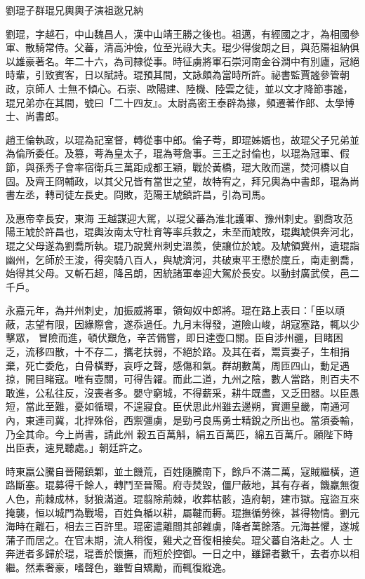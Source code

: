 
\begin{pinyinscope}

 劉琨子群琨兄輿輿子演祖逖兄納



 劉琨，字越石，中山魏昌人，漢中山靖王勝之後也。祖邁，有經國之才，為相國參軍、散騎常侍。父蕃，清高沖儉，位至光祿大夫。琨少得俊朗之目，與范陽祖納俱以雄豪著名。年二十六，為司隸從事。時征虜將軍石崇河南金谷澗中有別廬，冠絕時輩，引致賓客，日以賦詩。琨預其間，文詠頗為當時所許。祕書監賈謐參管朝政，京師人
 士無不傾心。石崇、歐陽建、陸機、陸雲之徒，並以文才降節事謐，琨兄弟亦在其間，號曰「二十四友』。太尉高密王泰辟為掾，頻遷著作郎、太學博士、尚書郎。



 趙王倫執政，以琨為記室督，轉從事中郎。倫子荂，即琨姊婿也，故琨父子兄弟並為倫所委任。及篡，荂為皇太子，琨為荂詹事。三王之討倫也，以琨為冠軍、假節，與孫秀子會率宿衛兵三萬距成都王穎，戰於黃橋，琨大敗而還，焚河橋以自固。及齊王冏輔政，以其父兄皆有當世之望，故特宥之，拜兄輿為中書郎，琨為尚書左丞，轉司徒左長史。冏敗，范陽王虓鎮許昌，引為司馬。



 及惠帝幸長安，東海
 王越謀迎大駕，以琨父蕃為淮北護軍、豫州刺史。劉喬攻范陽王虓於許昌也，琨輿汝南太守杜育等率兵救之，未至而虓敗，琨輿虓俱奔河北，琨之父母遂為劉喬所執。琨乃說冀州刺史溫羨，使讓位於虓。及虓領冀州，遺琨詣幽州，乞師於王浚，得突騎八百人，與虓濟河，共破東平王懋於廩丘，南走劉喬，始得其父母。又斬石超，降呂朗，因統諸軍奉迎大駕於長安。以動封廣武侯，邑二千戶。



 永嘉元年，為并州刺史，加振威將軍，領匈奴中郎將。琨在路上表曰：「臣以頑蔽，志望有限，因緣際會，遂忝過任。九月末得發，道險山峻，胡寇塞路，輒以少擊眾，
 冒險而進，頓伏艱危，辛苦備嘗，即日達壺口關。臣自涉州疆，目睹困乏，流移四散，十不存二，攜老扶弱，不絕於路。及其在者，鬻賣妻子，生相捐棄，死亡委危，白骨橫野，哀呼之聲，感傷和氣。群胡數萬，周匝四山，動足遇掠，開目睹寇。唯有壺關，可得告糴。而此二道，九州之陰，數人當路，則百夫不敢進，公私往反，沒喪者多。嬰守窮城，不得薪采，耕牛既盡，又乏田器。以臣愚短，當此至難，憂如循環，不遑寢食。臣伏思此州雖去邊朔，實邇皇畿，南通河內，東連司冀，北捍殊俗，西禦彊虜，是勁弓良馬勇士精銳之所出也。當須委輸，乃全其命。今上尚書，請此州
 穀五百萬斛，絹五百萬匹，綿五百萬斤。願陛下時出臣表，速見聽處。」朝廷許之。



 時東嬴公騰自晉陽鎮鄴，並土饑荒，百姓隨騰南下，餘戶不滿二萬，寇賊繼橫，道路斷塞。琨募得千餘人，轉鬥至晉陽。府寺焚毀，僵尸蔽地，其有存者，饑羸無復人色，荊棘成林，豺狼滿道。琨翦除荊棘，收葬枯骸，造府朝，建市獄。寇盜互來掩襲，恒以城門為戰場，百姓負楯以耕，屬鞬而耨。琨撫循勞徠，甚得物情。劉元海時在離石，相去三百許里。琨密遣離間其部雜虜，降者萬餘落。元海甚懼，遂城蒲子而居之。在官未期，流人稍復，雞犬之音復相接矣。琨父蕃自洛赴之。人
 士奔迸者多歸於琨，琨善於懷撫，而短於控御。一日之中，雖歸者數千，去者亦以相繼。然素奢豪，嗜聲色，雖暫自矯勵，而輒復縱逸。




\end{pinyinscope}
